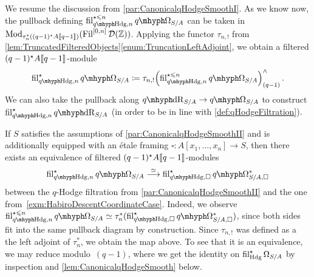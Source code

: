\documentclass[DIV=12,numbers=enddot,leqno,bibliography=totoc]{scrartcl}
\begin{document}
	\begin{numpar}\label{par:CanonicalqHodgeSmoothII}
		We resume the discussion from \cref{par:CanonicalqHodgeSmoothI}. As we know now, the pullback defining $\fil_{\qHodge,n}^{\star\leqslant n}\qOmega_{S/A}$ can be taken in $\operatorname{Mod}_{\tau_n^*((q-1)^\star A\llbracket q-1\rrbracket)}(\operatorname{Fil}^{[0,n]}\mathcal{D}(\mathbb{Z}))$. Applying the functor $\tau_{n,!}$ from \cref{lem:TruncatedFilteredObjects}\cref{enum:TruncationLeftAdjoint}, we obtain a filtered $(q-1)^\star A\llbracket q-1\rrbracket$-module
		\begin{equation*}
			\fil_{\qHodge,n}^\star\qOmega_{S/A}\coloneqq \tau_{n,!}\left(\fil_{\qHodge,n}^{\star\leqslant n}\qOmega_{S/A}\right)_{(q-1)}^\complete\,.
		\end{equation*}
		We can also take the pullback along $\qdeRham_{S/A}\rightarrow \qOmega_{S/A}$ to construct $\fil_{\qHodge,n}^\star\qdeRham_{S/A}$ (in order to be in line with \cref{def:qHodgeFiltration}).%
	\end{numpar}
	
	
	\begin{rem}
		If $S$ satisfies the assumptions of \cref{par:CanonicalqHodgeSmoothII} and is additionally equipped with  an étale framing $\square\colon A[x_1,\dotsc,x_n]\rightarrow S$, then there exists an equivalence of filtered $(q-1)^\star A\llbracket q-1\rrbracket$-modules
		\begin{equation*}
			\fil_{\qHodge,n}^\star\qOmega_{S/A}\overset{\simeq}{\longrightarrow}\fil_{\qHodge,\square}^\star\qOmega_{S/A, \square}^*
		\end{equation*}
		between the $q$-Hodge filtration from \cref{par:CanonicalqHodgeSmoothII} and the one from~\cref{exm:HabiroDescentCoordinateCase}. Indeed, we observe $\fil_{\qHodge,n}^{\star\leqslant n}\qOmega_{S/A}\simeq \tau_n^*(\fil_{\qHodge,\square}^\star\qOmega_{S/A, \square}^*)$, since both sides fit into the same pullback diagram by construction. Since $\tau_{n,!}$ was defined as a the left adjoint of $\tau_n^*$, we obtain the map above. To see that it is an equivalence, we may reduce modulo~$(q-1)$, where we get the identity on $\operatorname{fil}_{\mathrm{Hdg}}^\star\Omega_{S/A}$ by inspection and \cref{lem:CanonicalqHodgeSmooth} below.
	\end{rem}
	
\end{document}
